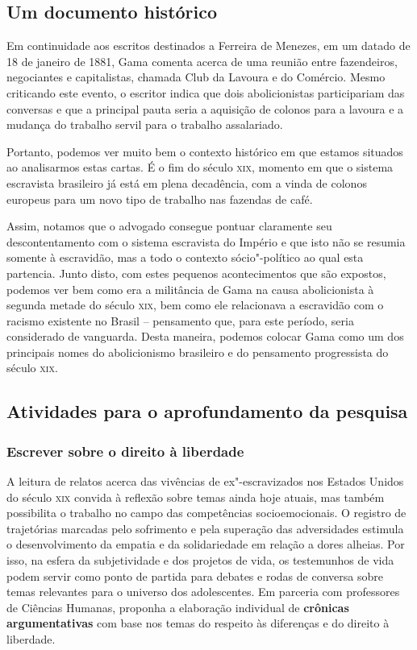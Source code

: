 \documentclass[12pt]{extarticle}
\begin{document}
\subsection{Um documento histórico}

Em continuidade aos escritos destinados a Ferreira de Menezes, em um datado
de 18 de janeiro de 1881, Gama comenta acerca de uma reunião entre
fazendeiros, negociantes e capitalistas, chamada Club da Lavoura e do
Comércio. Mesmo criticando este evento, o escritor indica que dois
abolicionistas participariam das conversas e que a principal pauta seria
a aquisição de colonos para a lavoura e a mudança do trabalho servil
para o trabalho assalariado.

Portanto, podemos ver muito bem o contexto histórico em que estamos
situados ao analisarmos estas cartas. É o fim do século \textsc{xix}, momento em
que o sistema escravista brasileiro já está em plena decadência, com a
vinda de colonos europeus para um novo tipo de trabalho nas fazendas de
café.

Assim, notamos que o advogado consegue pontuar claramente seu
descontentamento com o sistema escravista do Império e que isto não se
resumia somente à escravidão, mas a todo o contexto sócio"-político ao qual
esta partencia. Junto disto, com estes pequenos acontecimentos que são
expostos, podemos ver bem como era a militância de Gama na causa abolicionista
à segunda metade do século \textsc{xix}, bem como ele relacionava a
escravidão com o racismo existente no Brasil -- pensamento que, para este
período, seria considerado de vanguarda. Desta maneira, podemos colocar
Gama como um dos principais nomes do abolicionismo brasileiro e do
pensamento progressista do século \textsc{xix}.

\subsection{Atividades para o aprofundamento da pesquisa}


\subsubsection{Escrever sobre o direito à liberdade}

A leitura de relatos acerca das vivências de ex"-escravizados nos
Estados Unidos do século \textsc{xix} convida à reflexão sobre temas ainda hoje
atuais, mas também possibilita o trabalho no campo das competências
socioemocionais. O registro de trajetórias marcadas pelo sofrimento e
pela superação das adversidades estimula o desenvolvimento da empatia
e da solidariedade em relação a dores alheias. Por isso, na esfera da
subjetividade e dos projetos de vida, os testemunhos de vida podem
servir como ponto de partida para debates e rodas de conversa sobre
temas relevantes para o universo dos adolescentes. Em parceria com
professores de Ciências Humanas, proponha a elaboração individual de
\textbf{crônicas argumentativas} com base nos temas do respeito às
diferenças e do direito à liberdade. 
\end{document}
